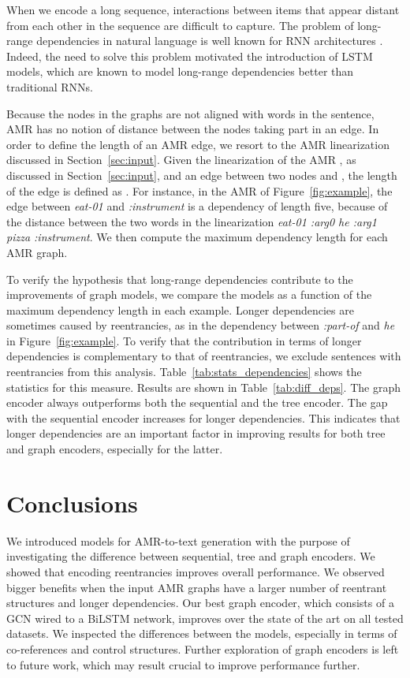 \documentclass[11pt,a4paper]{article}
\begin{document}
When we encode a long sequence, interactions between items that appear distant from each other in the sequence are difficult to capture. The problem of long-range dependencies in natural language is well known for RNN architectures \cite{bengio1994learning}. Indeed, the need to solve this problem motivated the introduction of LSTM models, which are known to model long-range dependencies better than traditional RNNs.

Because the nodes in the graphs are not aligned with words in the sentence, AMR has no notion of distance between the nodes taking part in an edge. In order to define the length of an AMR edge, we resort to the AMR linearization discussed in Section~\ref{sec:input}. Given the linearization of the AMR , as discussed in Section~\ref{sec:input}, and an edge between two nodes  and , the length of the edge is defined as . 
For instance, in the AMR of Figure~\ref{fig:example}, the edge between \emph{eat-01} and \emph{:instrument} is a dependency of length five, because of the distance between the two words in the linearization \emph{eat-01 :arg0 he :arg1 pizza :instrument}. 
We then compute the maximum dependency length for each AMR graph.

To verify the hypothesis that long-range dependencies contribute to the improvements of graph models, we compare the models as a function of the maximum dependency length in each example. Longer dependencies are sometimes caused by reentrancies, as in the dependency between \emph{:part-of} and \emph{he} in Figure~\ref{fig:example}. To verify that the contribution in terms of longer dependencies is complementary to that of reentrancies, we exclude sentences with reentrancies from this analysis. Table~\ref{tab:stats_dependencies} shows the statistics for this measure. Results are shown in Table~\ref{tab:diff_deps}. The graph encoder always outperforms both the sequential and the tree encoder. The gap with the sequential encoder increases for longer dependencies. This indicates that longer dependencies are an important factor in improving results for both tree and graph encoders, especially for the latter.





\section{Conclusions}
We introduced models for AMR-to-text generation with the purpose of investigating the difference between sequential, tree and graph encoders. We showed that encoding reentrancies improves overall performance. We observed bigger benefits when the input AMR graphs have a larger number of reentrant structures and longer dependencies. Our best graph encoder, which consists of a GCN wired to a BiLSTM network, improves over the state of the art on all tested datasets. 
We inspected the differences between the models, especially in terms of co-references and control structures. 
Further exploration of graph encoders is left to future work, which may result crucial to improve performance further.
\end{document}
